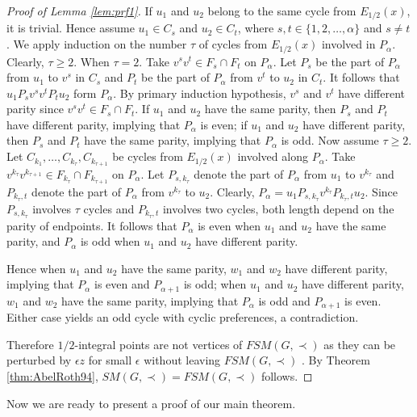 \documentclass[11pt]{article}
\numberwithin{theorem}{section}
\begin{document}
\begin{proof}[Proof of Lemma \ref{lem:prf1}]
If $u_1$ and $u_2$ belong to the same cycle from $E_{1/2}(x)$, it is trivial. Hence assume $u_1\in C_s$ and $u_2\in C_t$, where $s,t\in \{1,2,\ldots,\alpha\}$ and $s\not=t$. We apply induction on the number $\tau$ of cycles from $E_{1/2}(x)$ involved in $P_\alpha$. Clearly, $\tau\geq 2$.
When $\tau=2$. Take $v^s v^t\in F_s\cap F_t$ on $P_\alpha$.
Let $P_s$ be the part of $P_\alpha$ from $u_1$ to $v^s$ in $C_s$ and $P_t$ be the part of $P_\alpha$ from $v^t$ to $u_2$ in $C_t$.
It follows that $u_1 P_s v^s v^t P_t u_2$ form $P_\alpha$.
By primary induction hypothesis, $v^s$ and $v^t$ have different parity since $v^s v^t\in F_s\cap F_t$.
If $u_1$ and $u_2$ have the same parity, then $P_s$ and $P_t$ have different parity, implying that $P_\alpha$ is even; if $u_1$ and $u_2$ have different parity, then $P_s$ and $P_t$ have the same parity, implying that $P_\alpha$ is odd.
Now assume $\tau\geq 2$. Let $C_{k_1},\ldots,C_{k_\tau},C_{k_{\tau+1}}$ be cycles from $E_{1/2}(x)$ involved along $P_\alpha$.
Take $v^{k_{\tau}} v^{k_{\tau+1}} \in F_{k_{\tau}}\cap F_{k_{\tau+1}}$ on $P_\alpha$.
Let $P_{s, k_{\tau}}$ denote the part of $P_\alpha$ from $u_1$ to $v^{k_{\tau}}$ and $P_{k_{\tau},t}$ denote the part of $P_\alpha$ from $v^{k_{\tau}}$ to $u_2$.
Clearly, $P_\alpha=u_1 P_{s,k_\tau} v^{k_\tau} P_{k_\tau, t} u_2$. Since $P_{s, k_{\tau}}$ involves $\tau$ cycles and $P_{k_{\tau},t}$ involves two cycles, both length depend on the parity of endpoints. It follows that $P_\alpha$ is even when $u_1$ and $u_2$ have the same parity, and $P_\alpha$ is odd when $u_1$ and $u_2$ have different parity.

Hence when $u_1$ and $u_2$ have the same parity, $w_1$ and $w_2$ have different parity, implying that $P_\alpha$ is even and $P_{\alpha+1}$ is odd;
when $u_1$ and $u_2$ have different parity, $w_1$ and $w_2$ have the same parity, implying that $P_\alpha$ is odd and $P_{\alpha+1}$ is even.
Either case yields an odd cycle with cyclic preferences, a contradiction.

Therefore $1/2$-integral points are not vertices of $FSM(G,\prec)$ as they can be perturbed by $\epsilon z$ for small $\epsilon$ without leaving $FSM(G,\prec)$ . By Theorem \ref{thm:AbelRoth94}, $SM(G,\prec)=FSM(G,\prec)$ follows.
\end{proof}

Now we are ready to present a proof of our main theorem.
\end{document}
